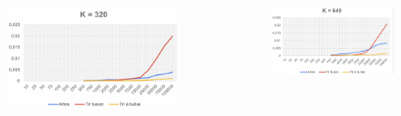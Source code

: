 \documentclass{beamer}
\begin{document}
\begin{frame}
  \begin{columns}
    \begin{figure}
      \includegraphics[width=\textwidth]{Beamer/K_320.png}
    \end{figure}

    \begin{figure}
      \includegraphics[width=\textwidth]{Beamer/K_640.png}
    \end{figure}
\end{columns}
\end{frame}
\end{document}
